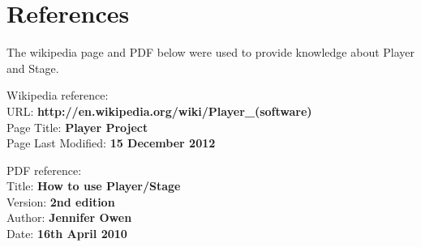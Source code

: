 \documentclass[a4paper,12pt]{article}
\begin{document}
\section{References}
\noindent The wikipedia page and PDF below were used to provide knowledge about Player and Stage.


\vspace{5mm}
\noindent Wikipedia reference:
\\URL: \textbf{http://en.wikipedia.org/wiki/Player\_(software)}
\\Page Title: \textbf{Player Project}
\\Page Last Modified: \textbf{15 December 2012}

\vspace{5mm}
\noindent PDF reference:
\\Title: \textbf{How to use Player/Stage}
\\Version: \textbf{2nd edition}
\\Author: \textbf{Jennifer Owen}
\\Date: \textbf{16th April 2010}
\end{document}
